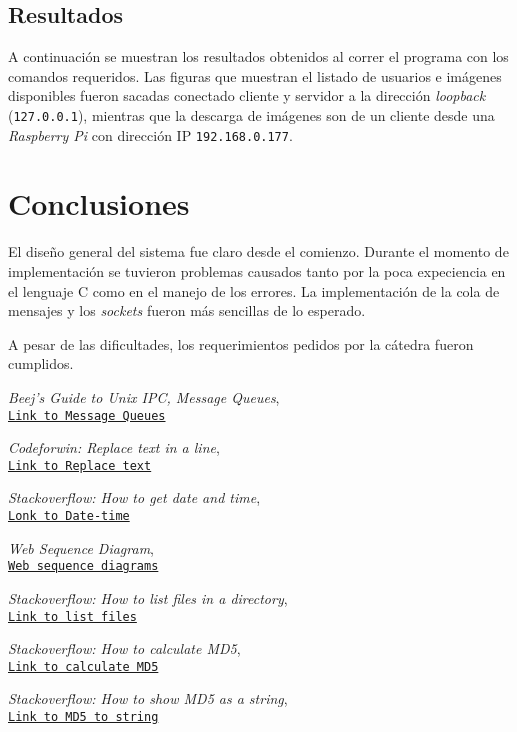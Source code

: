 \documentclass[12pt,a4paper]{article}
\begin{document}
\subsection{Resultados}
\label{resultados}
A continuación se muestran los resultados obtenidos al correr el programa con
los comandos requeridos. Las figuras que muestran el listado de usuarios e
imágenes disponibles fueron sacadas conectado cliente y servidor a la dirección
\emph{loopback} (\verb|127.0.0.1|), mientras que la descarga de imágenes son de
un cliente desde una \emph{Raspberry Pi} con dirección IP \verb|192.168.0.177|.



\section{Conclusiones}
\label{conc}

El diseño general del sistema fue claro desde el comienzo. Durante el momento
de implementación se tuvieron problemas causados tanto por la poca expeciencia
en el lenguaje C como en el manejo de los errores. La implementación de la cola
de mensajes y los \emph{sockets} fueron más sencillas de lo esperado.

A pesar de las dificultades, los requerimientos pedidos por la cátedra fueron
cumplidos.


\begin{thebibliography}{9}
\emph{Beej's Guide to Unix IPC, Message Queues},
\\\texttt{\href{https://beej.us/guide/bgipc/html/multi/mq.html}{Link to Message Queues}}


\emph{Codeforwin: Replace text in a line},
\\\texttt{\href{https://codeforwin.org/2018/02/c-program-replace-specific-line-a-text-file.html}
{Link to Replace text}}


\emph{Stackoverflow: How to get date and time},
\\\texttt{\href{https://stackoverflow.com/questions/1442116/how-to-get-the-date-and-time-values-in-a-c-program}
{Lonk to Date-time}}

\emph{Web Sequence Diagram},
\\\texttt{\href{https://www.websequencediagrams.com/}{Web sequence diagrams}}

\emph{Stackoverflow: How to list files in a directory},
\\\texttt{\href{https://stackoverflow.com/questions/4204666/how-to-list-files-in-a-directory-in-a-c-program}{Link to list files}}

\emph{Stackoverflow: How to calculate MD5},
\\\texttt{\href{https://stackoverflow.com/questions/10324611/how-to-calculate-the-md5-hash-of-a-large-file-in-c}{Link to calculate MD5}}

\emph{Stackoverflow: How to show MD5 as a string},
\\\texttt{\href{https://stackoverflow.com/questions/7627723/how-to-create-a-md5-hash-of-a-string-in-c}{Link to MD5 to string}}
\end{thebibliography}
\end{document}
